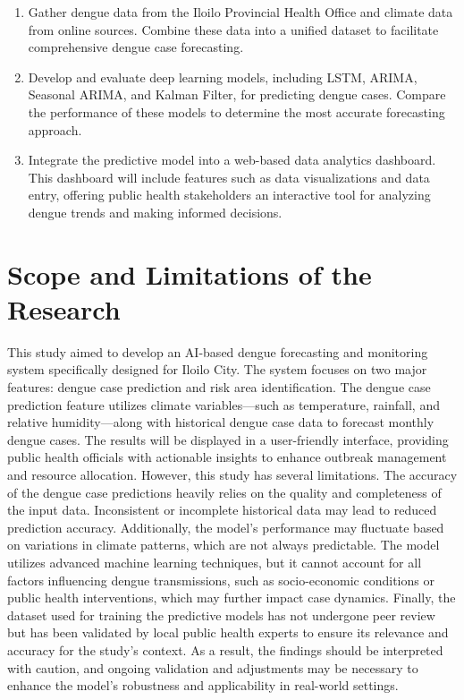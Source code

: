 \begin{enumerate}
	\item Gather dengue data from the Iloilo Provincial Health Office and climate data from online sources. Combine these data into a unified dataset to facilitate comprehensive dengue case forecasting.
	\item Develop and evaluate deep learning models, including LSTM, ARIMA, Seasonal ARIMA, and Kalman Filter, for predicting dengue cases. Compare the performance of these models to determine the most accurate forecasting approach.
	\item Integrate the predictive model into a web-based data analytics dashboard. This dashboard will include features such as data visualizations and data entry, offering public health stakeholders an interactive tool for analyzing dengue trends and making informed decisions.
\end{enumerate}


\section{Scope and Limitations of the Research}
\label{sec:scopelimitations}

This study aimed to develop an AI-based dengue forecasting and monitoring system specifically designed for Iloilo City. The system focuses on two major features: dengue case prediction and risk area identification. The dengue case prediction feature utilizes climate variables—such as temperature, rainfall, and relative humidity—along with historical dengue case data to forecast monthly dengue cases. The results will be displayed in a user-friendly interface, providing public health officials with actionable insights to enhance outbreak management and resource allocation.
However, this study has several limitations. The accuracy of the dengue case predictions heavily relies on the quality and completeness of the input data. Inconsistent or incomplete historical data may lead to reduced prediction accuracy. Additionally, the model’s performance may fluctuate based on variations in climate patterns, which are not always predictable.
The model utilizes advanced machine learning techniques, but it cannot account for all factors influencing dengue transmissions, such as socio-economic conditions or public health interventions, which may further impact case dynamics.
Finally, the dataset used for training the predictive models has not undergone peer review but has been validated by local public health experts to ensure its relevance and accuracy for the study's context. As a result, the findings should be interpreted with caution, and ongoing validation and adjustments may be necessary to enhance the model's robustness and applicability in real-world settings.


